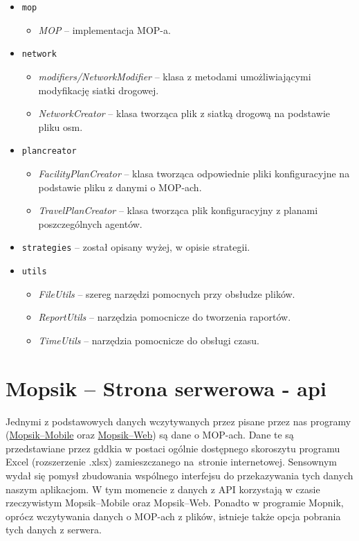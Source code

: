 \begin{itemize}
\begin{itemize}
        \end{itemize}
    \item \texttt{mop}
        \begin{itemize}
            \item \textit{MOP} -- implementacja MOP-a.
        \end{itemize}
    \item \texttt{network}
        \begin{itemize}
            \item \textit{modifiers/NetworkModifier} -- klasa z metodami umożliwiającymi modyfikację siatki drogowej.
            \item \textit{NetworkCreator} -- klasa tworząca plik z siatką drogową na podstawie pliku osm.
        \end{itemize}
    \item \texttt{plancreator}
        \begin{itemize}
            \item \textit{FacilityPlanCreator} -- klasa tworząca odpowiednie pliki konfiguracyjne na podstawie pliku z danymi o MOP-ach.
            \item \textit{TravelPlanCreator} -- klasa tworząca plik konfiguracyjny z planami poszczególnych agentów.
        \end{itemize}
    \item \texttt{strategies} -- został opisany wyżej, w opisie strategii.
    \item \texttt{utils}
        \begin{itemize}
            \item \textit{FileUtils} -- szereg narzędzi pomocnych przy obsłudze plików.
            \item \textit{ReportUtils} -- narzędzia pomocnicze do tworzenia raportów.
            \item \textit{TimeUtils} -- narzędzia pomocnicze do obsługi czasu.
        \end{itemize}        
    
\end{itemize}


\chapter{Mopsik -- Strona serwerowa - \acrshort{api}}
\label{mopsik_api}

Jednymi z podstawowych danych wczytywanych przez pisane przez nas programy (\hyperref[mopsik_mobile]{Mopsik--Mobile} oraz \hyperref[mopsik_web]{Mopsik--Web}) są dane o MOP-ach. Dane te są przedstawiane przez \acrshort{gddkia} w postaci ogólnie dostępnego skoroszytu programu Excel (rozszerzenie .xlsx) zamieszczanego na~stronie internetowej\cite{mop-gddkia}.
Sensownym wydał się pomysł zbudowania wspólnego interfejsu do przekazywania tych danych naszym aplikacjom. W tym momencie z danych z API korzystają w czasie rzeczywistym Mopsik--Mobile oraz Mopsik--Web. Ponadto w programie Mopnik, oprócz wczytywania danych o MOP-ach z plików, istnieje także opcja pobrania tych danych z serwera.

